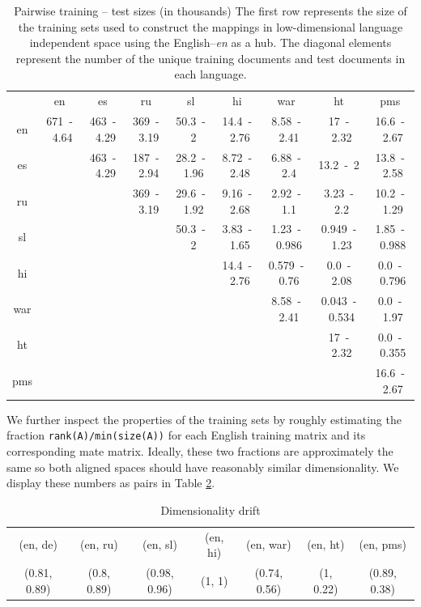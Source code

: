 \documentclass[twoside,11pt]{article}
\begin{document}
{
\renewcommand\tabcolsep{3pt}
\begin{table}[h!]
\centering
\caption{Pairwise training -- test sizes (in thousands)
The first row represents the size of the training sets used to construct the mappings in low-dimensional language independent space using the English--\emph{en} as a hub. The diagonal elements represent the number of the unique training documents and test documents in each language.
}
\label{table:train_test}
{
\small
\begin{tabular}{c|c|c|c|c|c|c|c|c|}
&	en&	es&	ru&	sl&	hi&	war&	ht&	pms\\\cline{1-9}
en&	671~-~4.64&	463~-~4.29&	369~-~3.19&	50.3~-~2&	14.4~-~2.76&	8.58~-~2.41&	 17~-~2.32&	16.6~-~2.67\\
\cline{2-9}
es&	\multicolumn{1}{c|}{}	&	463~-~4.29&	187~-~2.94&	28.2~-~1.96&	8.72~-~2.48&	 6.88~-~2.4&	13.2~-~2&	 13.8~-~2.58\\
\cline{3-9}
ru&	\multicolumn{2}{c|}{}	&	369~-~3.19&	29.6~-~1.92&	9.16~-~2.68&	2.92~-~1.1&	 3.23~-~2.2&	10.2~-~1.29\\
\cline{4-9}
sl&	\multicolumn{3}{c|}{}	&	50.3~-~2&	3.83~-~1.65&	1.23~-~0.986&	0.949~-~1.23&	 1.85~-~0.988\\
\cline{5-9}
hi&	\multicolumn{4}{c|}{}	&	14.4~-~2.76&	0.579~-~0.76&	0.0~-~2.08&	0.0~-~0.796\\
\cline{6-9}
war&	\multicolumn{5}{c|}{}	&	8.58~-~2.41&	0.043~-~0.534&	0.0~-~1.97\\
\cline{7-9}
ht&	\multicolumn{6}{c|}{}	&	17~-~2.32&	0.0~-~0.355\\
\cline{8-9}
pms&	\multicolumn{7}{c|}{}	&	16.6~-~2.67\\
\cline{9-9}
\end{tabular}
}
\end{table}
}

We further inspect the properties of the training sets by roughly estimating the fraction \texttt{rank(A)/min(size(A))} for each English training matrix and its corresponding mate matrix. Ideally, these two fractions are approximately the same so  both aligned spaces should have reasonably similar dimensionality. We display these numbers as pairs in Table \ref{table:rank}.

\begin{table}[h]
\caption{Dimensionality drift}
\label{table:rank}
\begin{tabular}{|c|c|c|c|c|c|c|}
\cline{1-7}
(en, de)     &   (en, ru)     &   (en, sl)       &     (en, hi)&   (en, war)      &      (en, ht) &   (en, pms)\\
\cline{1-7}
(0.81, 0.89)   &  (0.8, 0.89)  &   (0.98, 0.96)    &    (1, 1)  &   (0.74, 0.56)  &      (1, 0.22)  &   (0.89, 0.38)\\
\cline{1-7}
\end{tabular}
\end{table}
\end{document}
